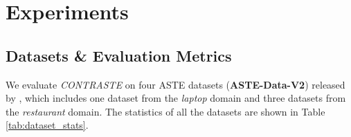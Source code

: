 \section{Experiments}\label{sec:experiments}

\subsection{Datasets \& Evaluation Metrics}

\begin{table}[!t]
    \centering
    \small
    \caption{ASTE-V2 dataset statistics. \#S denotes the no. of sentences, ‘POS’, ‘NEU’, and ‘NEG’ denote the no. of positive, neutral, and negative triplets respectively.}
    \label{tab:dataset_stats}
\end{table}

We evaluate \textit{CONTRASTE} on four ASTE datasets (\textbf{ASTE-Data-V2}) released by \citet{xu-etal-2020-position}, which includes one dataset from the \textit{laptop} domain and three datasets from the \textit{restaurant} domain. The statistics of all the datasets are shown in Table \ref{tab:dataset_stats}.

